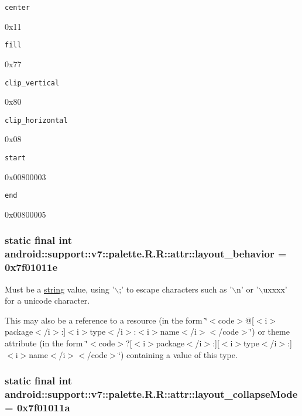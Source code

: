 {\tt center}

0x11

{\tt fill}

0x77

{\tt clip\_\-vertical}

0x80

{\tt clip\_\-horizontal}

0x08

{\tt start}

0x00800003

{\tt end}

0x00800005\hypertarget{classandroid_1_1support_1_1v7_1_1palette_1_1_r_1_1attr_ec129a5ca224a41a7ea13c291b0c3213}{
\subsubsection[{layout\_\-behavior}]{\setlength{\rightskip}{0pt plus 5cm}static final int android::support::v7::palette.R.R::attr::layout\_\-behavior = 0x7f01011e}}
\label{classandroid_1_1support_1_1v7_1_1palette_1_1_r_1_1attr_ec129a5ca224a41a7ea13c291b0c3213}


Must be a \hyperlink{classandroid_1_1support_1_1v7_1_1palette_1_1_r_1_1string}{string} value, using '$\backslash$;' to escape characters such as '$\backslash$n' or '$\backslash$uxxxx' for a unicode character. 

This may also be a reference to a resource (in the form \char`\"{}$<$code$>$@\mbox{[}$<$i$>$package$<$/i$>$:\mbox{]}$<$i$>$type$<$/i$>$:$<$i$>$name$<$/i$>$$<$/code$>$\char`\"{}) or theme attribute (in the form \char`\"{}$<$code$>$?\mbox{[}$<$i$>$package$<$/i$>$:\mbox{]}\mbox{[}$<$i$>$type$<$/i$>$:\mbox{]}$<$i$>$name$<$/i$>$$<$/code$>$\char`\"{}) containing a value of this type. \hypertarget{classandroid_1_1support_1_1v7_1_1palette_1_1_r_1_1attr_9c252166ef1e3e8d6766131b6967d018}{
\subsubsection[{layout\_\-collapseMode}]{\setlength{\rightskip}{0pt plus 5cm}static final int android::support::v7::palette.R.R::attr::layout\_\-collapseMode = 0x7f01011a}}
\label{classandroid_1_1support_1_1v7_1_1palette_1_1_r_1_1attr_9c252166ef1e3e8d6766131b6967d018}


